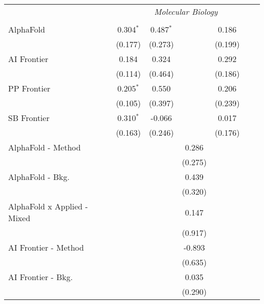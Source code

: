 \begin{tabular}{lcccccc}
 & \multicolumn{6}{c}{\textit{Molecular Biology}} \\ \\
   AlphaFold                     & 0.304$^{*}$ & 0.487$^{*}$ &         & 0.186   &        &   \\   
                                 & (0.177)     & (0.273)     &         & (0.199) &        &   \\   
   AI Frontier                   & 0.184       & 0.324       &         & 0.292   &        &   \\   
                                 & (0.114)     & (0.464)     &         & (0.186) &        &   \\   
   PP Frontier                   & 0.205$^{*}$ & 0.550       &         & 0.206   &        &   \\   
                                 & (0.105)     & (0.397)     &         & (0.239) &        &   \\   
   SB Frontier                   & 0.310$^{*}$ & -0.066      &         & 0.017   &        &   \\   
                                 & (0.163)     & (0.246)     &         & (0.176) &        &   \\   
   AlphaFold - Method            &             &             & 0.286   &         &        &   \\   
                                 &             &             & (0.275) &         &        &   \\   
   AlphaFold - Bkg.              &             &             & 0.439   &         &        &   \\   
                                 &             &             & (0.320) &         &        &   \\   
   AlphaFold x Applied - Mixed   &             &             & 0.147   &         &        &   \\   
                                 &             &             & (0.917) &         &        &   \\   
   AI Frontier - Method          &             &             & -0.893  &         &        &   \\   
                                 &             &             & (0.635) &         &        &   \\   
   AI Frontier - Bkg.            &             &             & 0.035   &         &        &   \\   
                                 &             &             & (0.290) &         &        &   \\   

\end{tabular}
